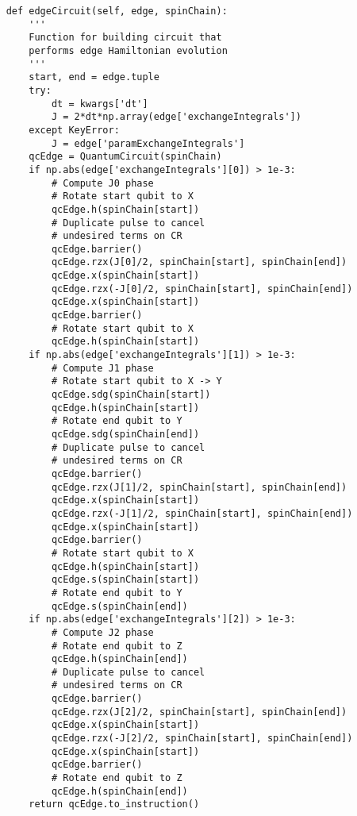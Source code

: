     \begin{verbatim}
    def edgeCircuit(self, edge, spinChain):
        '''
        Function for building circuit that
        performs edge Hamiltonian evolution
        '''
        start, end = edge.tuple
        try:
            dt = kwargs['dt']
            J = 2*dt*np.array(edge['exchangeIntegrals'])
        except KeyError:
            J = edge['paramExchangeIntegrals']
        qcEdge = QuantumCircuit(spinChain)
        if np.abs(edge['exchangeIntegrals'][0]) > 1e-3:
            # Compute J0 phase
            # Rotate start qubit to X
            qcEdge.h(spinChain[start])
            # Duplicate pulse to cancel
            # undesired terms on CR
            qcEdge.barrier()
            qcEdge.rzx(J[0]/2, spinChain[start], spinChain[end])
            qcEdge.x(spinChain[start])
            qcEdge.rzx(-J[0]/2, spinChain[start], spinChain[end])
            qcEdge.x(spinChain[start])
            qcEdge.barrier()
            # Rotate start qubit to X
            qcEdge.h(spinChain[start])
        if np.abs(edge['exchangeIntegrals'][1]) > 1e-3:
            # Compute J1 phase
            # Rotate start qubit to X -> Y
            qcEdge.sdg(spinChain[start])
            qcEdge.h(spinChain[start])
            # Rotate end qubit to Y
            qcEdge.sdg(spinChain[end])
            # Duplicate pulse to cancel
            # undesired terms on CR
            qcEdge.barrier()
            qcEdge.rzx(J[1]/2, spinChain[start], spinChain[end])
            qcEdge.x(spinChain[start])
            qcEdge.rzx(-J[1]/2, spinChain[start], spinChain[end])
            qcEdge.x(spinChain[start])
            qcEdge.barrier()
            # Rotate start qubit to X
            qcEdge.h(spinChain[start])
            qcEdge.s(spinChain[start])
            # Rotate end qubit to Y
            qcEdge.s(spinChain[end])
        if np.abs(edge['exchangeIntegrals'][2]) > 1e-3:
            # Compute J2 phase
            # Rotate end qubit to Z
            qcEdge.h(spinChain[end])
            # Duplicate pulse to cancel
            # undesired terms on CR
            qcEdge.barrier()
            qcEdge.rzx(J[2]/2, spinChain[start], spinChain[end])
            qcEdge.x(spinChain[start])
            qcEdge.rzx(-J[2]/2, spinChain[start], spinChain[end])
            qcEdge.x(spinChain[start])
            qcEdge.barrier()
            # Rotate end qubit to Z
            qcEdge.h(spinChain[end])
        return qcEdge.to_instruction()
    \end{verbatim}

